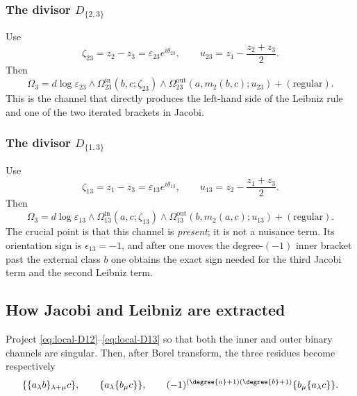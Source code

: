 \subsubsection*{The divisor $D_{\{2,3\}}$}

Use
\[
\zeta_{23}=z_2-z_3=\varepsilon_{23}e^{i\theta_{23}},
\qquad
u_{23}=z_1-\frac{z_2+z_3}{2}.
\]
Then
\begin{equation}
\label{eq:local-D23}
\Omega_3
=
d\log\varepsilon_{23}\wedge
\Omega_{23}^{\mathrm{in}}(b,c;\zeta_{23})
\wedge
\Omega_{23}^{\mathrm{out}}(a,m_2(b,c);u_{23})
+
(\text{regular}).
\end{equation}
This is the channel that directly produces the left-hand side of the Leibniz rule and
one of the two iterated brackets in Jacobi.

\subsubsection*{The divisor $D_{\{1,3\}}$}

Use
\[
\zeta_{13}=z_1-z_3=\varepsilon_{13}e^{i\theta_{13}},
\qquad
u_{13}=z_2-\frac{z_1+z_3}{2}.
\]
Then
\begin{equation}
\label{eq:local-D13}
\Omega_3
=
d\log\varepsilon_{13}\wedge
\Omega_{13}^{\mathrm{in}}(a,c;\zeta_{13})
\wedge
\Omega_{13}^{\mathrm{out}}(b,m_2(a,c);u_{13})
+
(\text{regular}).
\end{equation}
The crucial point is that this channel is \emph{present}; it is not a nuisance term.
Its orientation sign is $\epsilon_{13}=-1$, and after one moves the degree-$(-1)$
inner bracket past the external class $b$ one obtains the exact sign needed for the
third Jacobi term and the second Leibniz term.

\subsection{How Jacobi and Leibniz are extracted}

\begin{proposition}
\label{prop:ss-projection}
Project \eqref{eq:local-D12}--\eqref{eq:local-D13} so that both the inner and outer
binary channels are singular. Then, after Borel transform, the three residues become
respectively
\[
\{\{a_\lambda b\}_{\lambda+\mu}c\},
\qquad
\{a_\lambda\{b_\mu c\}\},
\qquad
(-1)^{(\degree{a}+1)(\degree{b}+1)}\{b_\mu\{a_\lambda c\}\}.
\]
\end{proposition}

